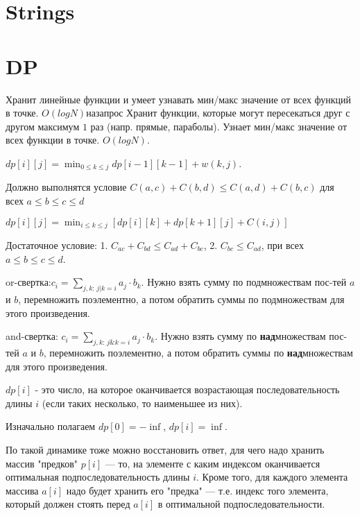 \documentclass[a4paper,10pt,twocolumn,oneside]{article}
\begin{document}
\section{Strings}


\section{DP}
{Хранит линейные функции и умеет узнавать мин/макс значение от всех функций в точке. $O(logN) на запрос$}
{Хранит функции, которые могут пересекаться друг с другом максимум $1$ раз (напр. прямые, параболы). Узнает мин/макс значение от всех функции в точке. $O(logN)$.} %
{$dp[i][j] = \min_{0 \leq k \leq j} dp[i - 1][k - 1] + w(k, j)$. 

Должно выполнятся условие $C(a,c) + C(b,d) \leq  C(a, d) + C(b, c)$ для всех $a \leq b \leq c \leq d$} 
{$dp[i][j] = \min_{i \leq k \leq j}[dp[i][k] + dp[k + 1][j] + C(i, j)]$

Достаточное условие: 1. $C_{ac}+C_{bd}\le C_{ad}+C_{bc}$, 2. $C_{bc}\le C_{ad}$, при всех $a\le b\le c\le d$.}
{or-свертка:$c_i = \sum_{j,k:\,j | k = i} a_j \cdot b_k$. Нужно взять сумму по подмножествам пос-тей $a$ и $b$, перемножить поэлементно, а потом обратить суммы по подмножествам для этого произведения.

and-свертка: $c_i = \sum_{j,k:\,j \& k = i} a_j \cdot b_k$. Нужно взять сумму по \textbf{над}множествам пос-тей $a$ и $b$, перемножить поэлементно, а потом обратить суммы по \textbf{над}множествам для этого произведения.}
{
$dp[i]$ - это число, на которое оканчивается возрастающая последовательность длины $i$ (если таких несколько, то наименьшее из них).

Изначально полагаем $dp[0] = -\inf$, $dp[i] = \inf$.

По такой динамике тоже можно восстановить ответ, для чего надо хранить массив "предков" $p[i]$ — то, на элементе с каким индексом оканчивается оптимальная подпоследовательность длины $i$. Кроме того, для каждого элемента массива $a[i]$ надо будет хранить его "предка" — т.е. индекс того элемента, который должен стоять перед $a[i]$ в оптимальной подпоследовательности.
}
\end{document}
